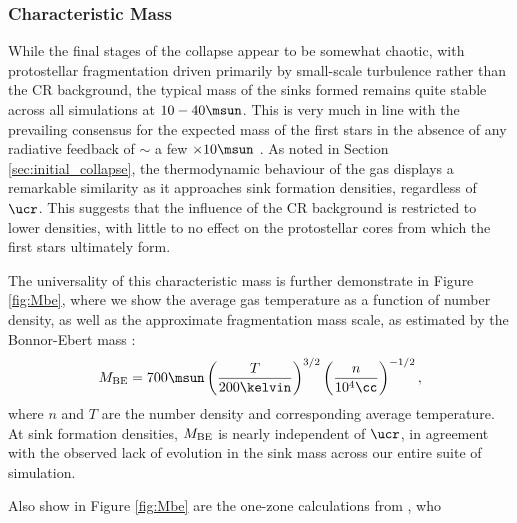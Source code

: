\subsubsection{Characteristic Mass}

While the final stages of the collapse appear to be somewhat chaotic, with protostellar fragmentation driven primarily by small-scale turbulence rather than the CR background, the typical mass of the sinks formed remains quite stable across all simulations at $10-40\msun$.
This is very much in line with the prevailing consensus for the expected mass of the first stars in the absence of any radiative feedback of $\sim$ a few $\times10\msun$ \citep{Bromm2013}.  
As noted in Section \ref{sec:initial_collapse}, the thermodynamic behaviour of the gas displays a remarkable similarity as it approaches sink formation densities, regardless of $\ucr$.
This suggests that the influence of the CR background is restricted to lower densities, with little to no effect on the protostellar cores from which the first stars ultimately form.

The universality of this characteristic mass is further demonstrate in Figure \ref{fig:Mbe}, where we show the average gas temperature as a function of number density, as well as the approximate fragmentation mass scale, as estimated by the Bonnor-Ebert mass \citep[e.g.,][]{StacyBromm2007}:
\begin{equation}
    M_{\rm \small BE} = 700\msun \left(\frac{T}{200\kelvin}\right)^{3/2}
                                 \left(\frac{n}{10^4\cc}   \right)^{-1/2},
\end{equation}
where $n$ and $T$ are the number density and corresponding average temperature.
At sink formation densities, $M_{\rm \small BE}$ is nearly independent of $\ucr$, in agreement with the observed lack of evolution in the sink mass across our entire suite of simulation.

Also show in Figure \ref{fig:Mbe} are the one-zone calculations from \citet{StacyBromm2007}, who